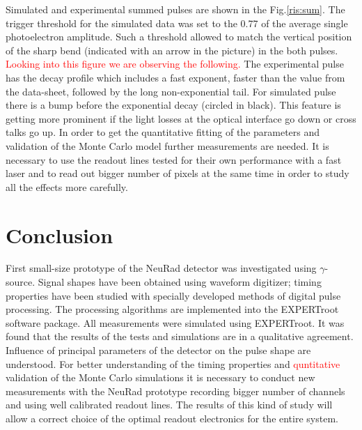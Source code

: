 \documentclass{webofc}
\newcommand{\er}{\textmd{EXPERTroot}}
\newcommand{\red}[1]{\textcolor{red}{#1}}
\begin{document}
Simulated and experimental summed pulses are shown in the Fig.\ref{ris:sum}.
The trigger threshold for the simulated data was set to the 0.77 of the average single photoelectron amplitude.
Such a threshold allowed to match the vertical position of the sharp bend (indicated with an arrow in the picture) in the both pulses. \red{Looking into this figure we are observing the following.} The experimental pulse has the decay profile which includes a fast exponent, faster than the value from the data-sheet, followed by the long non-exponential tail. For simulated pulse there is a bump before the exponential decay (circled in black). This feature is getting more prominent if the light losses at the optical interface go down or cross talks go up. In order to get the quantitative fitting of the parameters and validation of the Monte Carlo model further measurements are needed. It is necessary to use the readout lines tested for their own performance with a fast laser and to read out bigger number of pixels at the same time in order to study all the effects more carefully.

\section{Conclusion}
		
	First small-size prototype of the NeuRad detector was investigated using
	$\gamma$-source. Signal shapes have been obtained using waveform digitizer; timing properties have been studied with specially developed methods of digital pulse processing. The processing algorithms are implemented into the EXPERTroot software package. All measurements were simulated using \er. It was found that the results of the tests and simulations are in a qualitative agreement. Influence of principal parameters of the detector on the pulse shape are understood. For better understanding of the timing properties and \red{quntitative} validation of the Monte Carlo simulations it is necessary to conduct new measurements with the  NeuRad prototype recording bigger number of channels and using well calibrated readout lines.
	The results of this kind of study will allow a correct choice of the optimal readout electronics for the entire system.
	
	
\end{document}
